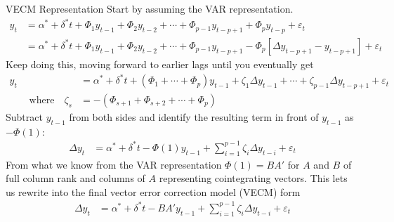 \documentclass[aspectratio=169, handout]{beamer}
\begin{document}
{\scriptsize
\begin{frame}{VECM Representation}
Start by assuming the VAR representation.
\begin{align*}
  y_t
  &=
  \alpha^* + \delta^* t
  + \Phi_1 y_{t-1}
  + \Phi_2 y_{t-2}
  + \cdots
  + \Phi_{p-1} y_{t-p+1}
  + \Phi_p y_{t-p}
  + \varepsilon_t
  \\
  &=
  \alpha^* + \delta^* t
  + \Phi_1 y_{t-1}
  + \Phi_2 y_{t-2}
  + \cdots
  + \Phi_{p-1} y_{t-p+1}
  - \Phi_p [\Delta y_{t-p+1}-y_{t-p+1}]
  + \varepsilon_t
\end{align*}
Keep doing this, moving forward to earlier lags until you eventually get
\begin{align*}
  y_t
  &=
  \alpha^* + \delta^* t
  + (\Phi_1 + \cdots + \Phi_p)y_{t-1}
  + \zeta_1 \Delta y_{t-1}
  + \cdots
  + \zeta_{p-1} \Delta y_{t-p+1}
  + \varepsilon_t
  \\
  \qquad\text{where}\quad
  \zeta_s
  &=
  -(\Phi_{s+1}+\Phi_{s+2}+\cdots + \Phi_p)
\end{align*}
Subtract $y_{t-1}$ from both sides and identify the resulting term in
front of $y_{t-1}$ as $-\Phi(1)$:
\begin{align*}
  \Delta  y_t
  &=
  \alpha^* + \delta^* t
  - \Phi(1)y_{t-1}
  + \sum_{i=1}^{p-1}
    \zeta_i \Delta y_{t-i}
  + \varepsilon_t
\end{align*}
From what we know from the VAR representation $\Phi(1)=BA'$ for $A$ and
$B$ of full column rank and columns of $A$ representing cointegrating
vectors.
This lets us rewrite into the final
\alert{vector error correction model} (VECM) form
\begin{align*}
  \Delta  y_t
  &=
  \alpha^* + \delta^* t
  - BA'y_{t-1}
  + \sum_{i=1}^{p-1}
    \zeta_i \Delta y_{t-i}
  + \varepsilon_t
\end{align*}

\end{frame}
}
\end{document}
